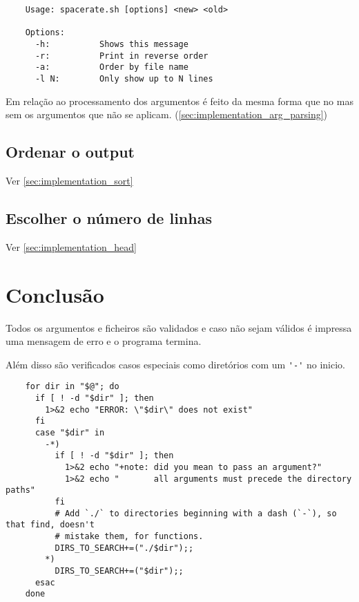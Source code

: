 \begin{listing}[H]
	\centering
	\begin{verbatim}
    Usage: spacerate.sh [options] <new> <old>

    Options:
      -h:          Shows this message
      -r:          Print in reverse order
      -a:          Order by file name
      -l N:        Only show up to N lines
  \end{verbatim}
\end{listing}

Em relação ao processamento dos argumentos é feito da mesma forma que no  mas sem os argumentos que não se aplicam. (\ref{sec:implementation_arg_parsing})

\subsection{Ordenar o output}

Ver \ref{sec:implementation_sort}

\subsection{Escolher o número de linhas}

Ver \ref{sec:implementation_head}


\section{Conclusão}

Todos os argumentos e ficheiros são validados e caso não sejam válidos é impressa uma mensagem de erro e o programa termina.

Além disso são verificados casos especiais como diretórios com um \Verb|'-'| no inicio.

\begin{listing}[H]
	\centering
	\begin{verbatim}
    for dir in "$@"; do
      if [ ! -d "$dir" ]; then
        1>&2 echo "ERROR: \"$dir\" does not exist"
      fi
      case "$dir" in
        -*)
          if [ ! -d "$dir" ]; then
            1>&2 echo "+note: did you mean to pass an argument?"
            1>&2 echo "       all arguments must precede the directory paths"
          fi
          # Add `./` to directories beginning with a dash (`-`), so that find, doesn't
          # mistake them, for functions.
          DIRS_TO_SEARCH+=("./$dir");;
        *)
          DIRS_TO_SEARCH+=("$dir");;
      esac
    done
  \end{verbatim}
\end{listing}
